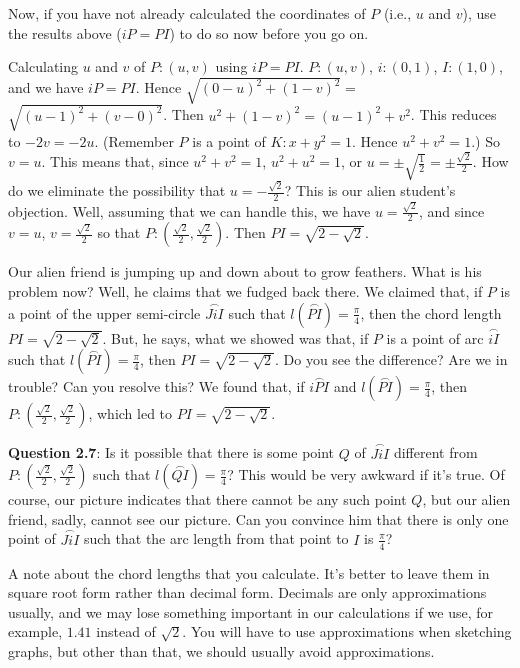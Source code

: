 \documentclass[english]{book}
\newcommand{\arc}[1]{\overset{\frown}{#1} }
\begin{document}
Now, if you have not already calculated the coordinates of $P$ (i.e., $u$ and $v$), use the results above ($iP = PI$) to do so now before you go on.

Calculating $u$ and $v$ of $P:(u,v)$ using $iP = PI$. $P:(u,v)$, $i:(0,1)$, $I:(1,0)$, and we have $iP = PI$. Hence $\sqrt{(0-u)^{2} + (1-v)^{2}} =$ $\sqrt{(u-1)^{2} + (v-0)^{2}}$. Then $u^{2} + (1-v)^{2} = (u-1)^{2} + v^{2}$. This reduces to $-2v = -2u$. (Remember $P$ is a point of $K:x + y^{2} = 1$. Hence $u^{2} + v^{2} = 1$.) So $v = u$. This means that, since $u^{2} + v^{2} = 1$, $u^{2} + u^{2} = 1$, or $u = \pm \sqrt{\frac{1}{2}} = \pm \frac{\sqrt{2}}{2}$. How do we eliminate the possibility that $u = - \frac{\sqrt{2}}{2}$? This is our alien student's objection. Well, assuming that we can handle this, we have $u = \frac{\sqrt{2}}{2}$, and since $v = u$, $v = \frac{\sqrt{2}}{2}$ so that $P:(\frac{\sqrt{2}}{2}, \frac{\sqrt{2}}{2})$. Then $PI = \sqrt{2-\sqrt{2}}$.

Our alien friend is jumping up and down about to grow feathers. What is his problem now? Well, he claims that we fudged back there. We claimed that, if $P$ is a point of the upper semi-circle $\arc{JiI}$ such that $l(\arc{PI}) = \frac{\pi}{4}$, then the chord length $PI = \sqrt{2-\sqrt{2}}$. But, he says, what we showed was that, if $P$ is a point of arc $\arc{iI}$ such that $l(\arc{PI}) = \frac{\pi}{4}$, then $PI = \sqrt{2-\sqrt{2}}$. Do you see the difference? Are we in trouble? Can you resolve this? We found that, if $\arc{iPI}$ and $l(\arc{PI}) = \frac{\pi}{4}$, then $P:(\frac{\sqrt{2}}{2},\frac{\sqrt{2}}{2})$, which led to $PI = \sqrt{2-\sqrt{2}}$.

\vspace{0.3cm}

\textbf{Question 2.7}: Is it possible that there is some point $Q$ of $\arc{JiI}$ different from $P:(\frac{\sqrt{2}}{2},\frac{\sqrt{2}}{2})$ such that $l(\arc{QI}) = \frac{\pi}{4}$? This would be very awkward if it's true. Of course, our picture indicates that there cannot be any such point $Q$, but our alien friend, sadly, cannot see our picture. Can you convince him that there is only one point of $\arc{JiI}$ such that the arc length from that point to $I$ is $\frac{\pi}{4}$?

A note about the chord lengths that you calculate. It's better to leave them in square root form rather than decimal form. Decimals are only approximations usually, and we may lose something important in our calculations if we use, for example, $1.41$ instead of $\sqrt{2}$. You will have to use approximations when sketching graphs, but other than that, we should usually avoid approximations.
\end{document}
